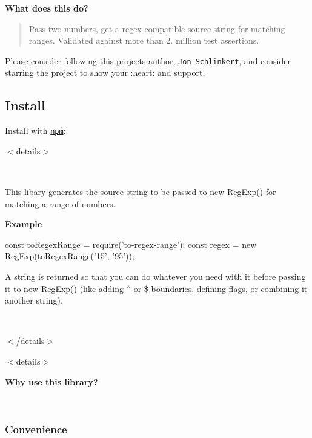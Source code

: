 {\bfseries What does this do?}

\begin{quote}
Pass two numbers, get a regex-\/compatible source string for matching ranges. Validated against more than 2. million test assertions. \end{quote}


Please consider following this project\textquotesingle{}s author, \href{https://github.com/jonschlinkert}{\tt Jon Schlinkert}, and consider starring the project to show your \+:heart\+: and support.

\subsection*{Install}

Install with \href{https://www.npmjs.com/}{\tt npm}\+:




$<$details$>$

~\newline


This libary generates the {\ttfamily source} string to be passed to {\ttfamily new Reg\+Exp()} for matching a range of numbers.

{\bfseries Example}


\begin{DoxyCode}
const toRegexRange = require('to-regex-range');
const regex = new RegExp(toRegexRange('15', '95'));
\end{DoxyCode}


A string is returned so that you can do whatever you need with it before passing it to {\ttfamily new Reg\+Exp()} (like adding {\ttfamily $^\wedge$} or {\ttfamily \$} boundaries, defining flags, or combining it another string).

~\newline


$<$/details$>$

$<$details$>$ 

{\bfseries Why use this library?}

~\newline


\subsubsection*{Convenience}

